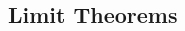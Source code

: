 \documentclass[8pt,landscape]{article}
\begin{document}
\begin{multicols}{3}

    \subsection{Limit Theorems}





\end{multicols}
\end{document}
